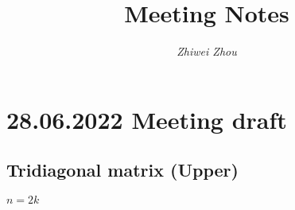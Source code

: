 \documentclass[11pt]{article}
\title{\textbf{Meeting Notes}}
\author{\textit{Zhiwei Zhou}}
\begin{document}
\maketitle

\section{28.06.2022 Meeting draft}


\subsection{Tridiagonal matrix (Upper)}






$n = 2k$
\end{document}
